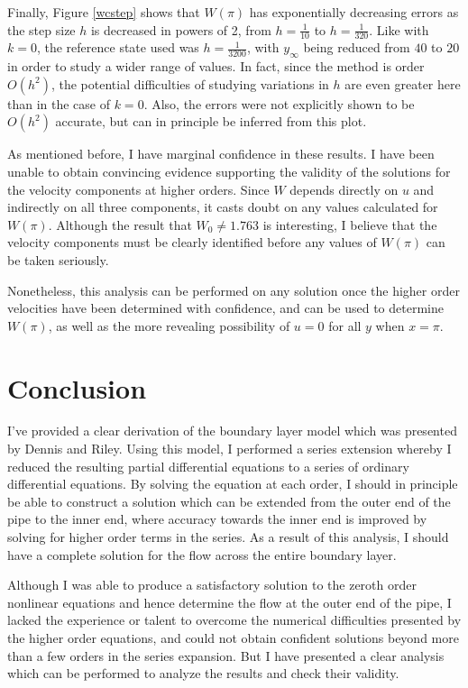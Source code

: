 \documentclass[10pt,a4paper]{report}
\begin{document}
Finally, Figure \ref{wcstep} shows that $W(\pi)$ has exponentially decreasing errors as the step size $h$ is decreased in powers of 2, from $h=\frac{1}{10}$ to $h=\frac{1}{320}$. Like with $k=0$, the reference state used was $h = \frac{1}{3200}$, with $y_\infty$ being reduced from $40$ to $20$ in order to study a wider range of values. In fact, since the method is order $O(h^2)$, the potential difficulties of studying variations in $h$ are even greater here than in the case of $k=0$. Also, the errors were not explicitly shown to be $O(h^2)$ accurate, but can in principle be inferred from this plot.

As mentioned before, I have marginal confidence in these results. I have been unable to obtain convincing evidence supporting the validity of the solutions for the velocity components at higher orders. Since $W$ depends directly on $u$ and indirectly on all three components, it casts doubt on any values calculated for $W(\pi)$. Although the result that $W_0 \neq 1.763$ is interesting, I believe that the velocity components must be clearly identified before any values of $W(\pi)$ can be taken seriously.

Nonetheless, this analysis can be performed on any solution once the higher order velocities have been determined with confidence, and can be used to determine $W(\pi)$, as well as the more revealing possibility of $u =0$ for all $y$ when $x = \pi$.

\chapter{Conclusion}
I've provided a clear derivation of the boundary layer model which was presented by Dennis and Riley. Using this model, I performed a series extension whereby I reduced the resulting partial differential equations to a series of ordinary differential equations. By solving the equation at each order, I should in principle be able to construct a solution which can be extended from the outer end of the pipe to the inner end, where accuracy towards the inner end is improved by solving for higher order terms in the series. As a result of this analysis, I should have a complete solution for the flow across the entire boundary layer.

Although I was able to produce a satisfactory solution to the zeroth order nonlinear equations and hence determine the flow at the outer end of the pipe, I lacked the experience or talent to overcome the numerical difficulties presented by the higher order equations, and could not obtain confident solutions beyond more than a few orders in the series expansion. But I have presented a clear analysis which can be performed to analyze the results and check their validity.
\end{document}
